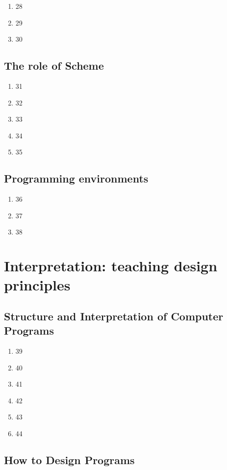 \documentclass{article}
\begin{document}
\begin{enumerate}
\item 28
\item 29
\item 30
\end{enumerate}

\subsection{The role of Scheme}

\begin{enumerate}
\item 31
\item 32
\item 33
\item 34
\item 35
\end{enumerate}

\subsection{Programming environments}

\begin{enumerate}
\item 36
\item 37
\item 38
\end{enumerate}

\section{Interpretation: teaching design principles}

\subsection{Structure and Interpretation of Computer Programs}

\begin{enumerate}
\item 39
\item 40
\item 41
\item 42
\item 43
\item 44
\end{enumerate}

\subsection{How to Design Programs}
\end{document}
